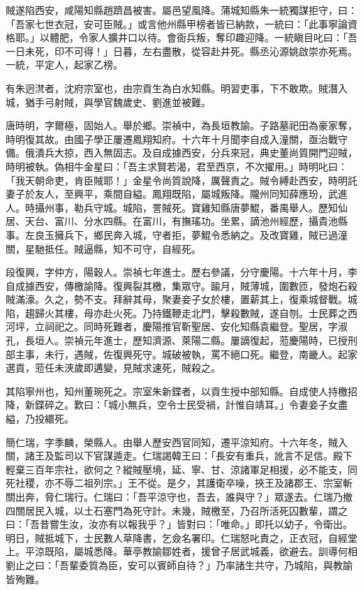 \begin{pinyinscope}
賊遂陷西安，咸陽知縣趙躋昌被害。屬邑望風降。蒲城知縣朱一統獨謀拒守，曰：「吾家七世衣冠，安可臣賊。」或言他州縣甲榜者皆已納款，一統曰：「此事寧論資格耶。」以體肥，令家人擴井口以待。會衙兵叛，奪印趣迎降。一統瞋目叱曰：「吾一日未死，印不可得！」日暮，左右盡散，從容赴井死。縣丞沁源姚啟崇亦死焉。一統，平定人，起家乙榜。

有朱迥滼者，沈府宗室也，由宗貢生為白水知縣。明習吏事，下不敢欺。賊潛入城，猶手弓射賊，與學官魏歲史、劉進並被難。

唐時明，字爾極，固始人。舉於鄉。崇禎中，為長垣教諭。子路墓祀田為豪家奪，時明復其故。由國子學正屢遷鳳翔知府。十六年十月聞李自成入潼關，亟治戰守備。俄潰兵大掠，西入無固志。及自成據西安，分兵來冠，典史董尚質開門迎賊，時明被執。偽相牛金星曰：「吾主求賢若渴，君至西京，不次擢用。」時明叱曰：「我天朝命吏，肯臣賊耶！」金星令尚質說降，厲聲責之。賊令縛赴西安，時明託妻子於友人，至興平，乘間自縊。鳳翔既陷，屬城叛降。隴州同知薛應玢，武進人。時攝州事，勒兵守城。城陷，詈賊死。寶雞知縣唐夢鯤，番禺舉人。歷知仙居、天台、富川、分水四縣。在富川，有撫瑤功。坐累，謫池州經歷，攝貴池縣事。左良玉擁兵下，鄉民奔入城，守者拒，夢鯤令悉納之。及改寶雞，賊已過潼關，星馳抵任。賊逼縣，知不可守，自經死。

段復興，字仲方，陽穀人。崇禎七年進士。歷右參議，分守慶陽。十六年十月，李自成據西安，傳檄諭降。復興裂其檄，集眾守。踰月，賊薄城，圍數匝，發炮石殺賊滿濠。久之，勢不支。拜辭其母，聚妻妾子女於樓，置薪其上，復乘城督戰。城陷，趨歸火其樓，母亦赴火死。乃持鐵鞭走北門，擊殺數賊，遂自刎。士民葬之西河坪，立祠祀之。同時死難者，慶陽推官靳聖居、安化知縣袁繼登。聖居，字淑孔，長垣人。崇禎元年進士，歷知濟源、萊陽二縣。屢謫復起，蒞慶陽時，已授刑部主事，未行，遇賊，佐復興死守。城破被執，罵不絕口死。繼登，南畿人。起家選貢，蒞任未浹歲即遘變，見賊求速死，賊殺之。

其陷寧州也，知州董琬死之。宗室朱新鍱者，以貢生授中部知縣。自成使人持檄招降，新鍱碎之。歎曰：「城小無兵，空令士民受禍，計惟自靖耳。」令妻妾子女盡縊，乃投繯死。

簡仁瑞，字季麟，榮縣人。由舉人歷安西官同知，遷平涼知府。十六年冬，賊入關，諸王及監司以下官謀遁走。仁瑞謁韓王曰：「長安有重兵，訛言不足信。殿下輕棄三百年宗社，欲何之？縱賊壓境，延、寧、甘、涼諸軍足相援，必不能支，同死社稷，亦不辱二祖列宗。」王不從。是夕，其護衛卒噪，挾王及諸郡王、宗室斬關出奔，脅仁瑞行。仁瑞曰：「吾平涼守也，吾去，誰與守？」眾遂去。仁瑞乃撤四關居民入城，以土石塞門為死守計。未幾，賊檄至，乃召所活死囚數輩，謂之曰：「吾昔嘗生汝，汝亦有以報我乎？」皆對曰：「唯命。」即托以幼子，令衛出。明日，賊抵城下，士民數人草降書，乞僉名署印。仁瑞怒叱責之，正衣冠，自經堂上。平涼既陷，屬城悉降。華亭教諭鄒姓者，援曾子居武城義，欲避去。訓導何相劉止之曰：「吾輩委質為臣，安可以賓師自待？」乃率諸生共守，乃城陷，與教諭皆殉難。


\end{pinyinscope}
